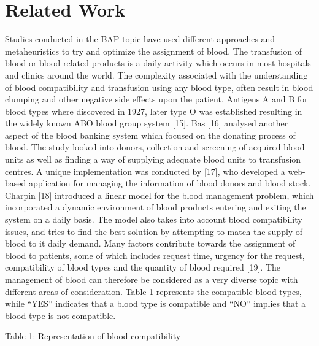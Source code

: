 \documentclass{article}
\begin{document}
\section{Related Work}
Studies conducted in the BAP topic have used different approaches and metaheuristics to try and optimize the assignment of blood. The transfusion of blood or blood related products is a daily activity which occurs in most hospitals and clinics around the world. The complexity associated with the understanding of blood compatibility and transfusion using any blood type, often result in blood clumping and other negative side effects upon the patient. Antigens A and B for blood types where discovered in 1927, later type O was established resulting in the widely known ABO blood group system [15]. Bas [16] analysed another aspect of the blood banking system which focused on the donating process of blood. The study looked into donors, collection and screening of acquired blood units as well as finding a way of supplying adequate blood units to transfusion centres. A unique implementation was conducted by [17], who developed a web-based application for managing the information of blood donors and blood stock. Charpin [18] introduced a linear model for the blood management problem, which incorporated a dynamic environment of blood products entering and exiting the system on a daily basis. The model also takes into account blood compatibility issues, and tries to find the best solution by attempting to match the supply of blood to it daily demand. Many factors contribute towards the assignment of blood to patients, some of which includes request time, urgency for the request, compatibility of blood types and the quantity of blood required [19]. The management of blood can therefore be considered as a very diverse topic with different areas of consideration. Table 1 represents the compatible blood types, while “YES” indicates that a blood type is compatible and “NO” implies that a blood type is not compatible.
\begin {center}
Table 1: {Representation of blood compatibility }
\break
\end {center}
\end{document}
